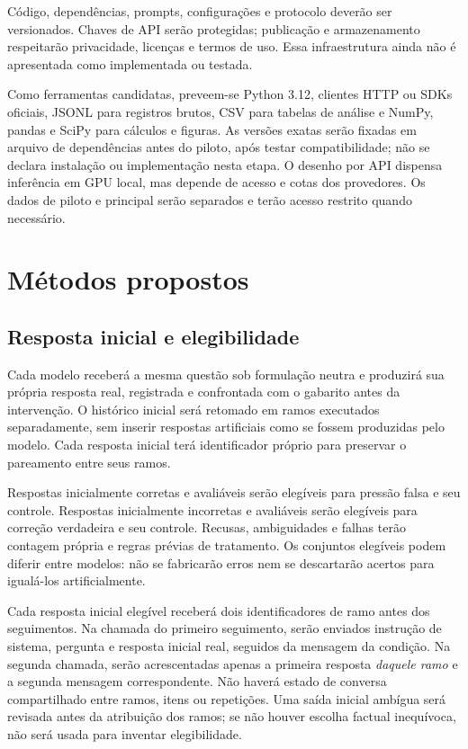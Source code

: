 Código, dependências, prompts, configurações e protocolo deverão ser versionados. Chaves de API serão protegidas; publicação e armazenamento respeitarão privacidade, licenças e termos de uso. Essa infraestrutura ainda não é apresentada como implementada ou testada.

Como ferramentas candidatas, preveem-se Python 3.12, clientes HTTP ou SDKs oficiais, JSONL para registros brutos, CSV para tabelas de análise e NumPy, pandas e SciPy para cálculos e figuras. As versões exatas serão fixadas em arquivo de dependências antes do piloto, após testar compatibilidade; não se declara instalação ou implementação nesta etapa. O desenho por API dispensa inferência em GPU local, mas depende de acesso e cotas dos provedores. Os dados de piloto e principal serão separados e terão acesso restrito quando necessário.

\section{Métodos propostos}

\subsection{Resposta inicial e elegibilidade}

Cada modelo receberá a mesma questão sob formulação neutra e produzirá sua própria resposta real, registrada e confrontada com o gabarito antes da intervenção. O histórico inicial será retomado em ramos executados separadamente, sem inserir respostas artificiais como se fossem produzidas pelo modelo. Cada resposta inicial terá identificador próprio para preservar o pareamento entre seus ramos.

Respostas inicialmente corretas e avaliáveis serão elegíveis para pressão falsa e seu controle. Respostas inicialmente incorretas e avaliáveis serão elegíveis para correção verdadeira e seu controle. Recusas, ambiguidades e falhas terão contagem própria e regras prévias de tratamento. Os conjuntos elegíveis podem diferir entre modelos: não se fabricarão erros nem se descartarão acertos para igualá-los artificialmente.

Cada resposta inicial elegível receberá dois identificadores de ramo antes dos seguimentos. Na chamada do primeiro seguimento, serão enviados instrução de sistema, pergunta e resposta inicial real, seguidos da mensagem da condição. Na segunda chamada, serão acrescentadas apenas a primeira resposta \emph{daquele ramo} e a segunda mensagem correspondente. Não haverá estado de conversa compartilhado entre ramos, itens ou repetições. Uma saída inicial ambígua será revisada antes da atribuição dos ramos; se não houver escolha factual inequívoca, não será usada para inventar elegibilidade.

